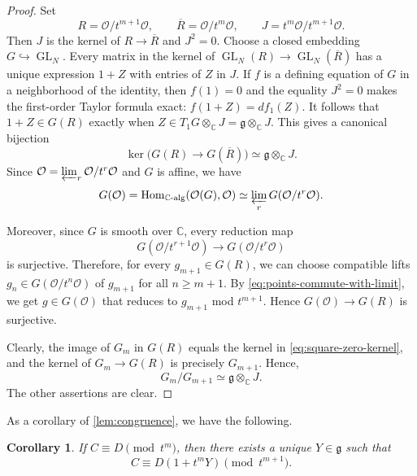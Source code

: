 \documentclass[11pt]{amsart}
\numberwithin{equation}{section}
\newtheorem{corollary}[corollary]{Corollary}
\theoremstyle{definition}
\theoremstyle{remark}
\begin{document}
\begin{proof}
Set
\[
  R=\mathcal O/t^{m+1}\mathcal O,\qquad
  \overline R=\mathcal O/t^m\mathcal O,\qquad
  J=t^m\mathcal O/t^{m+1}\mathcal O.
\]
Then $J$ is the kernel of $R\to\overline R$ and $J^2=0$.
Choose a closed embedding $G\hookrightarrow\operatorname{GL}_N$.  Every
matrix in the kernel of
$\operatorname{GL}_N(R)\to\operatorname{GL}_N(\overline R)$ has a unique expression $1+Z$ with entries of $Z$ in $J$.  If $f$ is a defining equation of $G$ in a neighborhood of the identity, then $f(1)=0$ and the equality $J^2=0$ makes the first-order Taylor formula exact: $  f(1+Z)=df_1(Z)$.
It follows that $1+Z\in G(R)$ exactly when $Z\in T_1G\otimes_{\mathbb C}J
  =\mathfrak g\otimes_{\mathbb C}J.$
This gives a canonical bijection
\begin{equation}\label{eq:square-zero-kernel}
  \ker\bigl(G(R)\longrightarrow G(\overline R)\bigr)
  \simeq \mathfrak g\otimes_{\mathbb C}J.
\end{equation}
Since
$\mathcal O=\varprojlim_r\mathcal O/t^r\mathcal O$ and $G$ is affine, we have
\begin{equation}\label{eq:points-commute-with-limit}
  G(\mathcal O)
  =\operatorname{Hom}_{\mathbb C\text{-alg}}(\mathcal{O}(G),\mathcal O)
  \simeq
  \varprojlim_rG(\mathcal O/t^r\mathcal O).
\end{equation}

Moreover, since $G$ is smooth over $\mathbb C$, every reduction map
\[
  G(\mathcal O/t^{r+1}\mathcal O)
  \longrightarrow
  G(\mathcal O/t^r\mathcal O)
\]
is surjective. Therefore, for every $g_{m+1}\in G(R)$, we can choose compatible lifts $g_n\in G(\mathcal O/t^{n}\mathcal O)$ of $g_{m+1}$ for all $n\geq m+1$. By
\eqref{eq:points-commute-with-limit}, we get $g\in G(\mathcal O)$ that reduces to $g_{m+1}$ mod $t^{m+1}$. Hence $ G(\mathcal O)\longrightarrow G(R)$ is surjective.

Clearly, the image of $G_m$ in $G(R)$ equals the kernel in
\eqref{eq:square-zero-kernel}, and the kernel of $G_m\to G(R)$ is precisely
$G_{m+1}$. Hence,
\[
  G_m/G_{m+1}\simeq\mathfrak g\otimes_{\mathbb C}J.
\]
The other assertions are clear. 
\end{proof}
As a corollary of \cref{lem:congruence}, we have the following.
\begin{corollary}
    If $C\equiv D\pmod{t^m}$, then there exists a unique $Y\in\mathfrak{g}$ such that
\begin{equation}\label{eq:error}
  C\equiv D(1+t^mY)\pmod{t^{m+1}}.
\end{equation}
\end{corollary}
\end{document}
